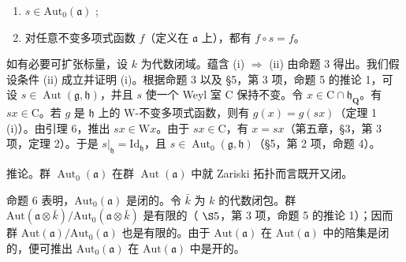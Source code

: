 \begin{enumerate}
\def\labelenumi{(\roman{enumi})}
\item
  \(s \in \text{Aut}_{0}(\mathfrak{a})\) ;
\item
对任意不变多项式函数 \(f\)（定义在 \(\mathfrak{a}\) 上），都有 \(f \circ s = f\)。
\end{enumerate}

如有必要可扩张标量，设 \(k\) 为代数闭域。蕴含 (i) \(\Longrightarrow\) (ii) 由命题 3 得出。我们假设条件 (ii) 成立并证明 (i)。根据命题 3 以及 §5，第 3 项，命题 5 的推论 1，可设 \(s \in \operatorname{Aut}(\mathfrak{g}, \mathfrak{h})\)，并且 \(s\) 使一个 Weyl 室 C 保持不变。令 \(x \in \mathrm{C} \cap \mathfrak{h}_{\mathbf{Q}}\)。有 \(sx \in \mathrm{C}\)。若 \(g\) 是 \(\mathfrak{h}\) 上的 W-不变多项式函数，则有 \(g(x) = g(sx)\)（定理 1 (i)）。由引理 6，推出 \(sx \in \mathrm{W}x\)。由于 \(sx \in \mathrm{C}\)，有 \(x = sx\)（第五章，§3，第 3 项，定理 2）。于是 \(s|_{\mathfrak{h}} = \mathrm{Id}_{\mathfrak{h}}\)，且 \(s \in \operatorname{Aut}_0(\mathfrak{g}, \mathfrak{h})\)（§5，第 2 项，命题 4）。

推论。群 \(\operatorname{Aut}_{0}(\mathfrak{a})\) 在群 \(\operatorname{Aut}(\mathfrak{a})\) 中就 Zariski 拓扑而言既开又闭。

命题 6 表明，\(\mathrm{Aut}_0(\mathfrak{a})\) 是闭的。令 \(\bar{k}\) 为 \(k\) 的代数闭包。群 \(\mathrm{Aut}(\mathfrak{a} \otimes \bar{k}) / \mathrm{Aut}_0(\mathfrak{a} \otimes \bar{k})\) 是有限的（ \(\S 5\)，第 3 项，命题 5 的推论 1）；因而群 \(\mathrm{Aut}(\mathfrak{a}) / \mathrm{Aut}_0(\mathfrak{a})\) 也是有限的。由于 \(\mathrm{Aut}(\mathfrak{a})\) 在 \(\mathrm{Aut}(\mathfrak{a})\) 中的陪集是闭的，便可推出 \(\mathrm{Aut}_0(\mathfrak{a})\) 在 \(\mathrm{Aut}(\mathfrak{a})\) 中是开的。